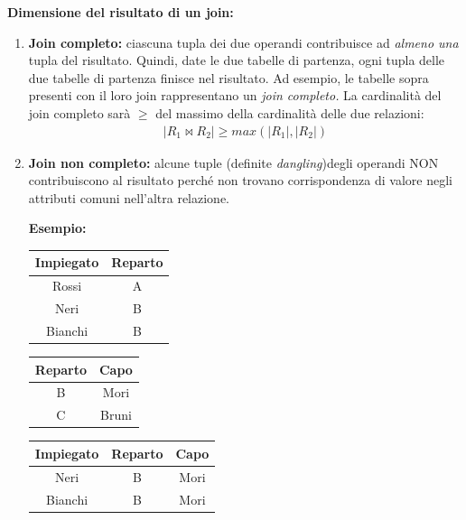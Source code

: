 \documentclass{article}
\begin{document}
\begin{itemize}
\textbf{Dimensione del risultato di un join:} \begin{enumerate}
    \item \textbf{Join completo:} ciascuna tupla dei due operandi contribuisce ad \textit{almeno una} tupla del risultato. Quindi, date le due tabelle di partenza, ogni tupla delle due tabelle di partenza finisce nel risultato. Ad esempio, le tabelle sopra presenti con il loro join rappresentano un \textit{join completo.} La cardinalità del join completo sarà $\geq$ del massimo della cardinalità delle due relazioni: \begin{align*}
        | R_1 \bowtie R_2 | \geq max(|R_1|,|R_2|)
    \end{align*}
    \item \textbf{Join non completo:} alcune tuple (definite \textit{dangling})degli operandi NON contribuiscono al risultato perché non trovano corrispondenza di valore negli attributi comuni nell'altra relazione.

    
\textbf{Esempio:}

\begin{minipage}{.25\textwidth}
  \centering
    \begin{tabular}{|c|c|}
        \hline
        \textbf{Impiegato} & \textbf{Reparto} \\
        \hline
        Rossi & A \\
        \hline
        Neri &  B \\
        \hline
        Bianchi & B \\
         \hline
        \end{tabular}
\end{minipage}%
\hfill
\begin{minipage}{.25\textwidth}
  \centering
       \begin{tabular}{|c|c|}
        \hline
        \textbf{Reparto} & \textbf{Capo} \\
        \hline
        B & Mori\\
        \hline
        C & Bruni\\
         \hline
        \end{tabular}
\end{minipage}
\hfill
\begin{minipage}{.25\textwidth}
  \centering
       \begin{tabular}{|c|c|c|}
        \hline
        \textbf{Impiegato} & \textbf{Reparto} & \textbf{Capo} \\
        \hline
        Neri & B & Mori\\
         \hline
         Bianchi & B & Mori\\
         \hline
        \end{tabular}
\hspace{1em}
\end{minipage}


\end{enumerate}
\end{itemize}
\end{document}
